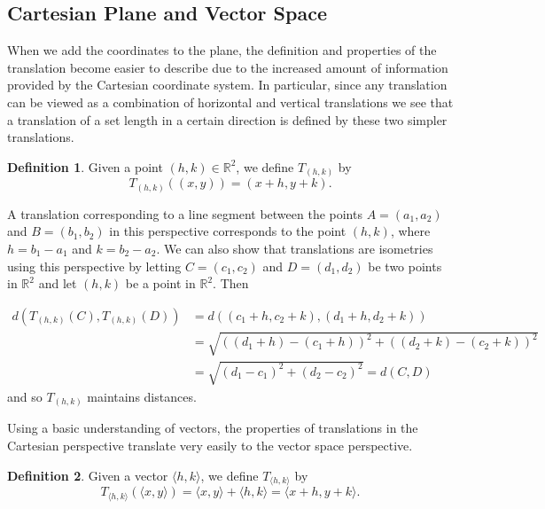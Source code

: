 \documentclass[
]{book}
\theoremstyle{definition}
\newtheorem{definition}{Definition}[chapter]
\theoremstyle{definition}
\theoremstyle{definition}
\theoremstyle{definition}
\theoremstyle{remark}
\begin{document}
\hypertarget{cartesian-plane-and-vector-space}{%
\subsection{Cartesian Plane and Vector Space}\label{cartesian-plane-and-vector-space}}

When we add the coordinates to the plane, the definition and properties of the translation become easier to describe due to the increased amount of information provided by the Cartesian coordinate system. In particular, since any translation can be viewed as a combination of horizontal and vertical translations we see that a translation of a set length in a certain direction is defined by these two simpler translations.

\begin{definition}
Given a point \((h,k)\in \mathbb{R}^2\), we define \(T_{(h,k)}\) by \[T_{(h,k)} \left( (x,y)\right) = (x+h,y+k).\]
\end{definition}

A translation corresponding to a line segment between the points \(A=(a_1,a_2)\) and \(B=(b_1,b_2)\) in this perspective corresponds to the point \((h,k)\), where \(h=b_1-a_1\) and \(k=b_2-a_2\). We can also show that translations are isometries using this perspective by letting \(C=(c_1,c_2)\) and \(D=(d_1,d_2)\) be two points in \(\mathbb{R}^2\) and let \((h,k)\) be a point in \(\mathbb{R}^2\). Then

\begin{align*}
    d\left( T_{(h,k)}(C), T_{(h,k)}(D)\right) & = d\left( (c_1+h,c_2+k), (d_1+h,d_2+k)\right) \\
     & = \sqrt{ \left( (d_1+h)-(c_1+h)\right)^2 + \left( (d_2+k)-(c_2+k)\right)^2 } \\
     & = \sqrt{ (d_1-c_1)^2 + (d_2-c_2)^2 } = d\left(C,D\right) 
\end{align*}
and so \(T_{(h,k)}\) maintains distances.

Using a basic understanding of vectors, the properties of translations in the Cartesian perspective translate very easily to the vector space perspective.

\begin{definition}
Given a vector \(\langle h,k\rangle\), we define \(T_{\langle h,k \rangle}\) by \[T_{\langle h,k \rangle} \left( \langle x,y\rangle \right) = \langle x,y \rangle + \langle h,k \rangle = \langle x+h,y+k\rangle.\]
\end{definition}
\end{document}
